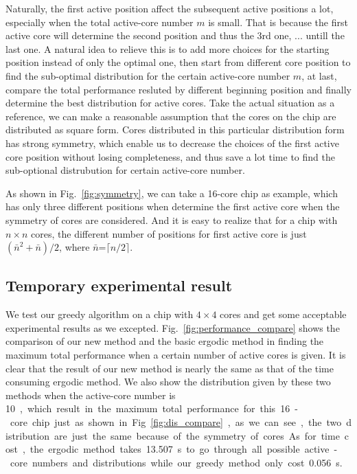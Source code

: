 Naturally, the first active position affect the subsequent active positions a lot, especially when the total active-core
number $m$ is small. That is because the first active core will determine the second position and thus the 3rd one, ...
untill the last one. A natural idea to relieve this is to add more choices for the starting position instead of only the
optimal one, then start from different core position to find the sub-optimal distribution for the certain active-core
number $m$, at last,  compare the total performance resluted by different beginning position and finally determine the
best distribution for active cores.
Take the actual situation as a reference, we can make a reasonable assumption that the cores on the chip are distributed as square form. Cores distributed in
this particular distribution form has strong symmetry, which enable us to decrease the choices of the first active core
position without losing completeness, and thus save a lot time to find the sub-optional distrubution for certain
active-core number.

As shown in Fig.~\ref{fig:symmetry}, we can take a 16-core chip as example, which has only three different positions when determine
the first active core when the symmetry of cores are considered. And it is easy to realize that for a chip with $n
\times n$ cores, the different number of positions for first active core is just $(\bar{n}^2+\bar{n})/2$, where
$\bar{n}$=$\lceil n/2 \rceil$.
\subsection{Temporary experimental result}
We test our greedy algorithm on a chip with $4 \times 4$ cores and get some acceptable experimental results as we
excepted. Fig.~\ref{fig:performance_compare} shows the comparison of our new method and the basic ergodic method in finding the maximum total
performance when a certain number of active cores is given. It is clear that the result of our new method is nearly the
same as that of the time consuming ergodic method. We also show the distribution given by these two methods when the
active-core number is \SI{10}, which result in the maximum total performance for this 16-core chip just as shown in
Fig.~\ref{fig:dis_compare}, as we can see, the two distribution are just the same because of the symmetry of cores.
As for time cost, the ergodic method takes \SI{13.507}s to go through all possible active-core numbers and distributions
while our greedy method only cost \SI{0.056}s.

